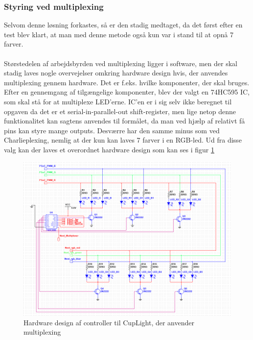 \documentclass[HardwareDesign/HardwareDesign_main.tex]{subfiles}
\begin{document}
\subsubsection{Styring ved multiplexing}
Selvom denne løsning forkastes, så er den stadig medtaget, da det først efter en test blev klart, at man med denne metode også kun var i stand til at opnå 7 farver.\\\\
Størstedelen af arbejdsbyrden ved multiplexing ligger i software, men der skal stadig laves nogle overvejelser omkring hardware design hvis, der anvendes multiplexing gennem hardware. Det er f.eks. hvilke komponenter, der skal bruges. Efter en gennemgang af tilgængelige komponenter, blev der valgt en 74HC595 IC\cite{datasheet_shiftreg}, som skal stå for at multiplexe LED'erne. IC'en er i sig selv ikke beregnet til opgaven da det er et serial-in-parallel-out shift-register, men lige netop denne funktionalitet kan sagtens anvendes til formålet, da man ved hjælp af relativt få pins kan styre mange outputs. Desværre har den samme minus som ved Charlieplexing, nemlig at der kun kan laves 7 farver i en RGB-led. Ud fra disse valg kan der laves et overordnet hardware design som kan ses i figur \ref{fig:CupLight_HW_Multiplexing}
\begin{figure}[H]
    \centering
    \includegraphics[width=\textwidth]{HardwareDesign/CupLight/graphics/CupLight.png}
    \caption{Hardware design af controller til CupLight, der anvender multiplexing}
    \label{fig:CupLight_HW_Multiplexing}
\end{figure}
\end{document}
